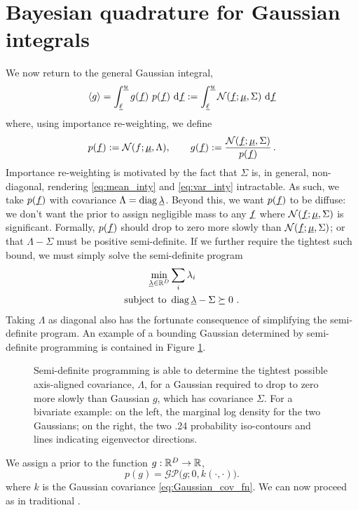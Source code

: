 \documentclass[twoside]{article}
\begin{document}
\section{Bayesian quadrature for Gaussian integrals}

We now return to the general Gaussian integral,
\begin{equation}
 \langle g \rangle=\int_{\underline{\smash{\ell}}}^{\underline{\smash{u}}} g(\underline{\smash{f}})~p(\underline{\smash{f}})~\mathrm{d} \underline{\smash{f}}:= \int_{\underline{\smash{\ell}}}^{\underline{\smash{u}}} \mathcal{N}(\underline{\smash{f}};\underline{\smash{\mu}},\Sigma)~\mathrm{d} \underline{\smash{f}}
\end{equation}
where, using importance re-weighting, we define
\begin{equation}
 p(\underline{\smash{f}}):= \mathcal{N}(f;\underline{\smash{\mu}},\Lambda), \qquad g(\underline{\smash{f}}) := \frac{\mathcal{N}(\underline{\smash{f}};\underline{\smash{\mu}},\Sigma)}{p(\underline{\smash{f}})}\,.
\end{equation}
Importance re-weighting is motivated by the fact that $\Sigma$ is, in general, non-diagonal, rendering \eqref{eq:mean_inty} and \eqref{eq:var_inty} intractable. As such, we take $p(\underline{\smash{f}})$ with covariance $\Lambda = \operatorname{diag} \underline{\smash{\lambda}}$. Beyond this, we want $p(\underline{\smash{f}})$ to be diffuse: we don't want the prior to assign negligible mass to any $\underline{\smash{f}}$ where $\mathcal{N}(\underline{\smash{f}};\underline{\smash{\mu}},\Sigma)$ is significant. Formally, $p(\underline{\smash{f}})$ should drop to zero more slowly than $\mathcal{N}(\underline{\smash{f}};\underline{\smash{\mu}},\Sigma)$; or that $\Lambda - \Sigma$ must be positive semi-definite. If we further require the tightest such bound, we must simply solve the semi-definite program
\begin{align}
 \min_{\underline{\smash{\lambda}}\in\mathbb{R}^D} & \sum_i \lambda_i\\
\text{subject to } & \operatorname{diag}{\underline{\smash{\lambda}}} - \Sigma \succeq 0~.
\end{align}
Taking $\Lambda$ as diagonal also has the fortunate consequence of simplifying the semi-definite program. An example of a bounding Gaussian determined by semi-definite programming is contained in Figure \ref{fig:bounding_ellipse}.

\begin{figure}
\caption{Semi-definite programming is able to determine the tightest possible axis-aligned covariance, $\Lambda$, for a Gaussian required to drop to zero more slowly than Gaussian $g$, which has covariance $\Sigma$. For a bivariate example: on the left, the marginal log density for the two Gaussians; on the right, the two .24 probability iso-contours and lines indicating eigenvector directions.}
\label{fig:bounding_ellipse}
\end{figure}

We assign a \gp prior 
to the function $g: \mathbb{R}^D \to \mathbb{R}$,
\begin{equation}
 p(g) = \mathcal{GP}\bigl(g; 0 , k(\cdot,\cdot)\bigr).
\end{equation}
 where $k$ is the Gaussian covariance \eqref{eq:Gaussian_cov_fn}. We can now proceed as in traditional \bq. 
\end{document}
